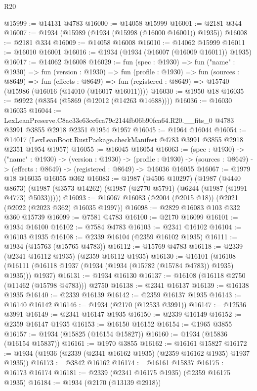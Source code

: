 \begin{lexlean}{R20}
\begin{coremodule}
@15999 := @14131 @4783
@16000 := @14058 @15999
@16001 := @2181 @344
@16007 := @1934 (@15989 (@1934 (@15998 (@16000 @16001)) @1935))
@16008 := @2181 @334
@16009 := @14058 @16008
@16010 := @14062 @15999
@16011 := @16010 @16001
@16016 := @1934 (@1934 (@16007 (@16009 @16011)) @1935)
@16017 := @14062 @16008
@16029 := fun (spec : @1930) =>
  fun ("name" : @1930) =>
  fun (version : @1930) =>
  fun (profile : @1930) =>
  fun (sources : @8649) =>
  fun (effects : @8649) =>
  fun (registered : @8649) => @15740 (@15986 (@16016 (@14010 (@16017 @16011))))
@16030 := @1950 @18
@16035 := @9922 (@8354 (@5869 (@12012 (@14263 @14688))))
@16036 := @16030 @16035
@16044 := LexLeanPreserve.C8ac33e63cc6ca79c2144fb06b90fca64.R20.__fits_0
    @4783
    @3991
    @3855
    @2918
    @2351
    @1954
    @1957
@16045 := @1964 @16044
@16054 := @14017 (LexLeanBoot.RustPackage.checkManifest @4783 @3991 @3855 @2918 @2351 @1954 @1957)
@16055 := @16045 @16054
@16063 := (spec : @1930) ->
  ("name" : @1930) ->
  (version : @1930) ->
  (profile : @1930) ->
  (sources : @8649) -> (effects : @8649) -> (registered : @8649) -> @16036 @16055
@16067 := @1979 @18 @16035 @16055 @362
@16083 := @1987
    (@4506 @10297)
    (@1987
      (@4440 @8673)
      (@1987 (@3573 @14262) (@1987 (@2770 @5791) (@6244 (@1987 (@1991 @4773) @5033)))))
@16093 := @16067 @16083 (@2004 (@2015 @18)) (@2021 (@2022 (@2023 @362) @16035 @1997))
@16098 := @2829 @16083 @103 @332 @360 @15739
@16099 := @7581 @4783
@16100 := @2170 @16099
@16101 := @1934 @16100
@16102 := @7584 @4783
@16103 := @2341 @16102
@16104 := @16103 @1935
@16108 := @2339 @16104 (@2359 @16102 @1935)
@16111 := @1934 (@15763 (@15765 @4783))
@16112 := @15769 @4783
@16118 := @2339 (@2341 @16112 @1935) (@2359 @16112 @1935)
@16130 := @16101
    (@16108 (@16111 (@16118 @1937 (@1934 (@1934 (@15782 (@15784 @4783)) @1935) @1935))) @1937)
@16131 := @1934 @16130
@16137 := @16108 (@16118 @2750 (@11462 (@15798 @4783))) @2750
@16138 := @2341 @16137
@16139 := @16138 @1935
@16140 := @2339 @16139
@16142 := @2359 @16137 @1935
@16143 := @16140 @16142
@16146 := @1934 (@2170 (@12533 @3991))
@16147 := @12536 @3991
@16149 := @2341 @16147 @1935
@16150 := @2339 @16149
@16152 := @2359 @16147 @1935
@16153 := @16150 @16152
@16154 := @1965 @3855
@16157 := @1934 (@15825 (@16154 @15827))
@16160 := @1934 (@15836 (@16154 @15837))
@16161 := @1970 @3855
@16162 := @16161 @15827
@16172 := @1934 (@1936 (@2339 (@2341 @16162 @1935) (@2359 @16162 @1935) @1937 @1935))
@16173 := @3842 @16162
@16174 := @16161 @15837
@16175 := @16173 @16174
@16181 := @2339 (@2341 @16175 @1935) (@2359 @16175 @1935)
@16184 := @1934 (@2170 (@13139 @2918))

\end{coremodule}
\end{lexlean}
